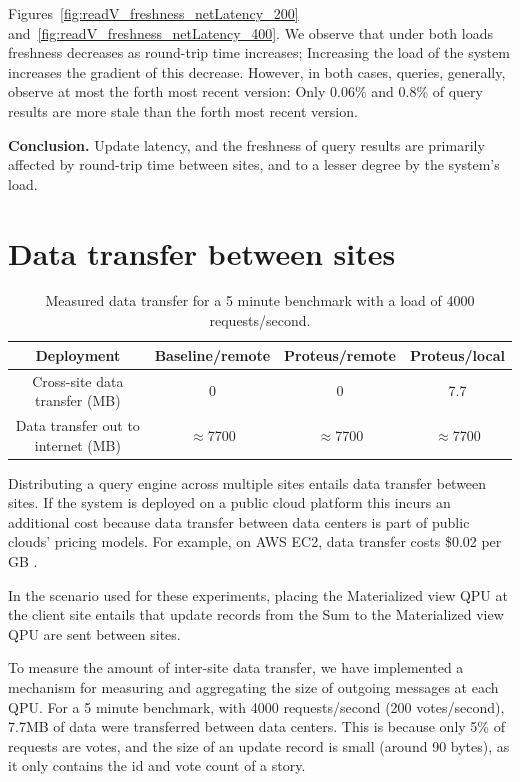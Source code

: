 Figures~\ref{fig:readV_freshness_netLatency_200} and~\ref{fig:readV_freshness_netLatency_400}.
We observe that under both loads freshness decreases as round-trip time increases;
Increasing the load of the system increases the gradient of this decrease.
However, in both cases, queries, generally, observe at most the forth most recent version:
Only 0.06\% and 0.8\% of query results are more stale than the forth most recent version.

\medskip
\noindent
\textbf{Conclusion.}
Update latency, and the freshness of query results are primarily affected by round-trip time between sites,
and to a lesser degree by the system's load.

\section{Data transfer between sites}
\label{sec:eval_data_transfer}

\begin{table}[H]
\centering
\begin{tabular}{|c||c|c|c||}
\hline
Deployment & Baseline/remote & Proteus/remote & Proteus/local \\
\hline
Cross-site data transfer (MB) & 0 & 0 & 7.7 \\
\hline
Data transfer out to internet (MB) & $\approx$7700 & $\approx$7700 & $\approx$7700 \\
\hline
\end{tabular}
\caption{Measured data transfer for a 5 minute benchmark with a load of 4000 requests/second.}
\label{tab:data_transfer}
\end{table}

Distributing a query engine across multiple sites entails data transfer between sites.
If the system is deployed on a public cloud platform this incurs an additional cost
because data transfer between data centers is part of public clouds' pricing models.
For example, on AWS EC2, data transfer costs \$0.02 per GB \cite{aws:pricing}.

In the scenario used for these experiments, placing the Materialized view QPU at the client site entails that
update records from the Sum to the Materialized view QPU are sent between sites.

To measure the amount of inter-site data transfer,
we have implemented a mechanism for measuring and aggregating the size of outgoing messages at each QPU.
For a 5 minute benchmark, with 4000 requests/second (200 votes/second), 7.7MB of data were transferred between data centers.
This is because only 5\% of requests are votes, and the size of an update record is small (around 90 bytes),
as it only contains the id and vote count of a story.

